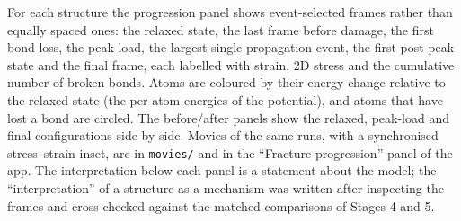 For each structure the progression panel shows event-selected frames rather than equally spaced ones: the relaxed state, the last frame before damage, the first bond loss, the peak load, the largest single propagation event, the first post-peak state and the final frame, each labelled with strain, 2D stress and the cumulative number of broken bonds. Atoms are coloured by their energy change relative to the relaxed state (the per-atom energies of the potential), and atoms that have lost a bond are circled. The before/after panels show the relaxed, peak-load and final configurations side by side. Movies of the same runs, with a synchronised stress--strain inset, are in \texttt{movies/} and in the ``Fracture progression'' panel of the app. The interpretation below each panel is a statement about the model; the ``interpretation'' of a structure as a mechanism was written after inspecting the frames and cross-checked against the matched comparisons of Stages 4 and 5.

